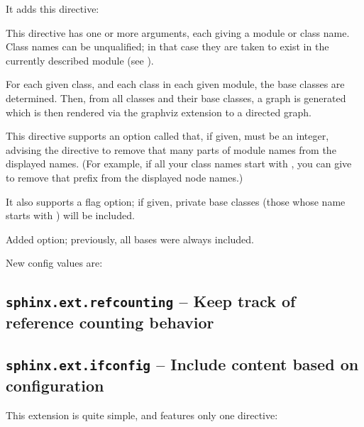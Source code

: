 \documentclass[letterpaper,10pt,english]{sphinxmanual}
\begin{document}
It adds this directive:

\begin{fulllineitems}
\label{ext/inheritance:directive-inheritance-diagram}
This directive has one or more arguments, each giving a module or class
name.  Class names can be unqualified; in that case they are taken to exist
in the currently described module (see {\hyperref[domains:directive\string-py:module]{}}).

For each given class, and each class in each given module, the base classes
are determined.  Then, from all classes and their base classes, a graph is
generated which is then rendered via the graphviz extension to a directed
graph.

This directive supports an option called  that, if given, must be an
integer, advising the directive to remove that many parts of module names
from the displayed names.  (For example, if all your class names start with
, you can give  to remove that prefix from the displayed
node names.)

It also supports a  flag option; if given, private base
classes (those whose name starts with \code{\_}) will be included.

Added  option; previously, all bases were always
included.

\end{fulllineitems}


New config values are:


\subsection{\texttt{sphinx.ext.refcounting} -- Keep track of reference counting behavior}
\label{ext/refcounting:sphinx-ext-refcounting-keep-track-of-reference-counting-behavior}\label{ext/refcounting:module-sphinx.ext.refcounting}\label{ext/refcounting::doc}

\subsection{\texttt{sphinx.ext.ifconfig} -- Include content based on configuration}
\label{ext/ifconfig:sphinx-ext-ifconfig-include-content-based-on-configuration}\label{ext/ifconfig:module-sphinx.ext.ifconfig}\label{ext/ifconfig::doc}
This extension is quite simple, and features only one directive:
\end{document}
